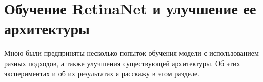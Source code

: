 \section{Обучение RetinaNet и улучшение ее архитектуры}\label{sect-6}

Мною были предприняты несколько попыток обучения модели с использованием разных подходов, а также улучшения существующей архитектуры. Об этих экспериментах и об их результатах я расскажу в этом разделе.






\clearpage